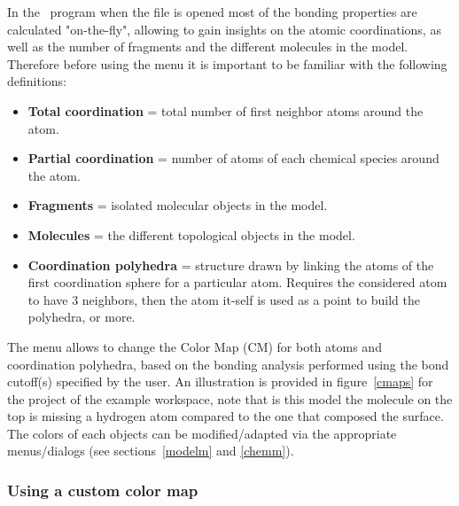 In the \atomes\ program when the file is opened most of the bonding properties are calculated "on-the-fly", allowing to gain insights on the atomic coordinations, 
as well as the number of fragments and the different molecules in the model. \\
Therefore before using the  menu it is important to be familiar with the following definitions: 
\begin{itemize}
\item {\bf{Total coordination}} = total number of first neighbor atoms around the atom.
\item {\bf{Partial coordination}} = number of atoms of each chemical species around the atom.
\item {\bf{Fragments}} = isolated molecular objects in the model. 
\item {\bf{Molecules}} = the different topological objects in the model.
\item {\bf{Coordination polyhedra}} = structure drawn by linking the atoms of the first coordination sphere for a particular atom. 
Requires the considered atom to have 3 neighbors, then the atom it-self is used as a point to build the polyhedra, or more.
\end{itemize}
The  menu allows to change the Color Map (CM) for both atoms and coordination polyhedra, 
based on the bonding analysis performed using the bond cutoff(s) specified by the user. 
An illustration is provided in figure~\ref{cmaps} for the  project of the example workspace, 
note that is this model the molecule on the top is missing a hydrogen atom compared to the one that composed the surface. \\
The colors of each objects can be modified/adapted via the appropriate menus/dialogs (see sections~\ref{modelm} and \ref{chemm}). \\ 
\cmapfig

\clearpage

\subsubsection*{Using a custom color map}

